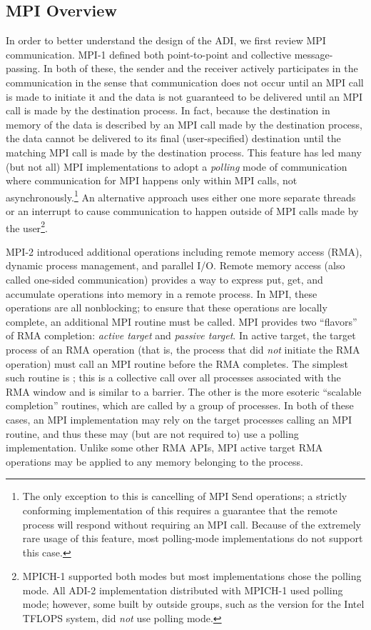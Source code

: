 \subsection{MPI Overview}
In order to better understand the design of the ADI, we first review
MPI communication.  MPI-1 defined both point-to-point and collective
message-passing.  In both of these, the sender and the receiver
actively participates in the communication in the sense that
communication does not occur until an MPI call is made to initiate it
and the data is not guaranteed to be delivered until an MPI call is
made by the destination process.  In fact, because the destination in memory of
the data is described by an MPI call made by the destination process, the
data cannot be delivered to its final (user-specified) destination
until the matching MPI call is made by the destination process.  This feature
has led many (but not all) MPI implementations to adopt a
\emph{polling} mode of communication where communication for MPI
happens only within MPI calls, not asynchronously.\footnote{The only
  exception to this is cancelling of MPI Send operations; a strictly
  conforming implementation of this requires a guarantee that the
  remote process will respond without requiring an MPI call.  Because
  of the extremely rare usage of this feature, most polling-mode
  implementations do not support this case.} An alternative
approach uses either one more separate threads or an interrupt to
cause communication to happen outside of MPI calls made by the
user\footnote{MPICH-1 supported both modes but most implementations chose the
  polling mode.  All ADI-2 implementation distributed with MPICH-1 used
  polling mode; however, some built by outside groups, such as the version for the Intel TFLOPS system, did \emph{not} use polling mode.}.

MPI-2 introduced additional operations including remote memory access (RMA),
dynamic process management, and parallel I/O.  Remote memory
access (also called one-sided communication) provides a way to express
put, get, and accumulate operations into memory in a remote process.
In MPI, these operations are all nonblocking; to ensure that these
operations are locally complete, an additional MPI routine must be
called.  MPI provides two ``flavors'' of RMA completion: \emph{active
target}
and \emph{passive target}.  In active target,
the target process of an 
RMA operation (that is, the process that did \emph{not} initiate the
RMA operation) must call an MPI routine before the RMA completes.  The
simplest such routine is ; this is a collective call over
all 
processes associated with the RMA window and is similar to a barrier.
The other is the more esoteric ``scalable completion'' routines, which
are called by a group of processes.  In both of these cases, an MPI
implementation may rely on the target processes calling an MPI
routine, and thus these may (but are not required to) use a polling
implementation.   Unlike some other RMA APIs, MPI active target
RMA operations may be applied to any memory belonging to the process.

